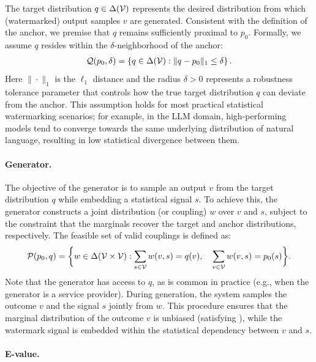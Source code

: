 The target distribution $q \in \Delta(\mathcal{V})$ represents the desired distribution from which (watermarked) output samples $v$ are generated. Consistent with the definition of the anchor, we premise that $q$ remains sufficiently proximal to $p_0$. Formally, we assume $q$ resides within the $\delta$-neighborhood of the anchor:
\begin{align*}
    \mathcal{Q}(p_0,\delta) = \left\{q \in \Delta(\mathcal{V}): \|q - p_0\|_1 \leq \delta\right\}.
\end{align*}
Here $\|\cdot\|_1$ is the $\ell_1$ distance and the radius $\delta>0$ represents a robustness tolerance parameter that controls how the true target distribution $q$ can deviate from the anchor. 
This assumption holds for most practical statistical watermarking scenarios; for example, in the LLM domain, high-performing models tend to converge towards the same underlying distribution of natural language, resulting in low statistical divergence between them.

\paragraph{Generator.}

The objective of the generator is to sample an output $v$ from the target distribution $q$ while embedding a statistical signal $s$. To achieve this, the generator constructs a joint distribution (or coupling) $w$ over $v$ and $s$, subject to the constraint that the marginals recover the target and anchor distributions, respectively. The feasible set of valid couplings is defined as:
\begin{align*}
    \mathcal{P}(p_0,q) = \bigg\{w \in \Delta(\mathcal{V} \times \mathcal{V}): \sum_{s \in \mathcal{V}}w(v,s) = q(v), \quad \sum_{v\in \mathcal{V}}w(v,s) = p_0(s)\bigg\}.
\end{align*}
Note that the generator has access to $q$, as is common in practice (e.g., when the generator is a service provider). During generation, the system samples the outcome $v$ and the signal $s$ jointly from $w$. This procedure ensures that the marginal distribution of the outcome $v$ is unbiased (satisfying ), while the watermark signal is embedded within the statistical dependency between $v$ and $s$.

\paragraph{E-value.}

